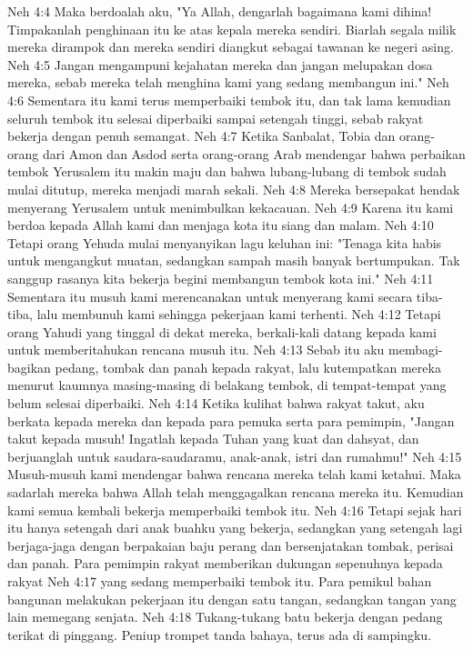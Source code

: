 Neh 4:4  Maka berdoalah aku, "Ya Allah, dengarlah bagaimana kami dihina! Timpakanlah penghinaan itu ke atas kepala mereka sendiri. Biarlah segala milik mereka dirampok dan mereka sendiri diangkut sebagai tawanan ke negeri asing.
Neh 4:5  Jangan mengampuni kejahatan mereka dan jangan melupakan dosa mereka, sebab mereka telah menghina kami yang sedang membangun ini."
Neh 4:6  Sementara itu kami terus memperbaiki tembok itu, dan tak lama kemudian seluruh tembok itu selesai diperbaiki sampai setengah tinggi, sebab rakyat bekerja dengan penuh semangat.
Neh 4:7  Ketika Sanbalat, Tobia dan orang-orang dari Amon dan Asdod serta orang-orang Arab mendengar bahwa perbaikan tembok Yerusalem itu makin maju dan bahwa lubang-lubang di tembok sudah mulai ditutup, mereka menjadi marah sekali.
Neh 4:8  Mereka bersepakat hendak menyerang Yerusalem untuk menimbulkan kekacauan.
Neh 4:9  Karena itu kami berdoa kepada Allah kami dan menjaga kota itu siang dan malam.
Neh 4:10  Tetapi orang Yehuda mulai menyanyikan lagu keluhan ini: "Tenaga kita habis untuk mengangkut muatan, sedangkan sampah masih banyak bertumpukan. Tak sanggup rasanya kita bekerja begini membangun tembok kota ini."
Neh 4:11  Sementara itu musuh kami merencanakan untuk menyerang kami secara tiba-tiba, lalu membunuh kami sehingga pekerjaan kami terhenti.
Neh 4:12  Tetapi orang Yahudi yang tinggal di dekat mereka, berkali-kali datang kepada kami untuk memberitahukan rencana musuh itu.
Neh 4:13  Sebab itu aku membagi-bagikan pedang, tombak dan panah kepada rakyat, lalu kutempatkan mereka menurut kaumnya masing-masing di belakang tembok, di tempat-tempat yang belum selesai diperbaiki.
Neh 4:14  Ketika kulihat bahwa rakyat takut, aku berkata kepada mereka dan kepada para pemuka serta para pemimpin, "Jangan takut kepada musuh! Ingatlah kepada Tuhan yang kuat dan dahsyat, dan berjuanglah untuk saudara-saudaramu, anak-anak, istri dan rumahmu!"
Neh 4:15  Musuh-musuh kami mendengar bahwa rencana mereka telah kami ketahui. Maka sadarlah mereka bahwa Allah telah menggagalkan rencana mereka itu. Kemudian kami semua kembali bekerja memperbaiki tembok itu.
Neh 4:16  Tetapi sejak hari itu hanya setengah dari anak buahku yang bekerja, sedangkan yang setengah lagi berjaga-jaga dengan berpakaian baju perang dan bersenjatakan tombak, perisai dan panah. Para pemimpin rakyat memberikan dukungan sepenuhnya kepada rakyat
Neh 4:17  yang sedang memperbaiki tembok itu. Para pemikul bahan bangunan melakukan pekerjaan itu dengan satu tangan, sedangkan tangan yang lain memegang senjata.
Neh 4:18  Tukang-tukang batu bekerja dengan pedang terikat di pinggang. Peniup trompet tanda bahaya, terus ada di sampingku.

